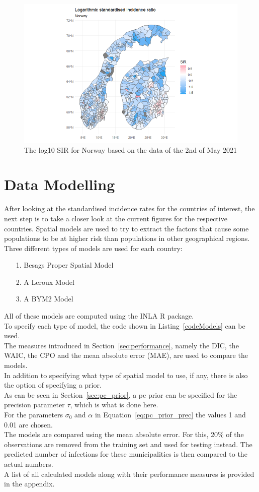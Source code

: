 \begin{figure}[H]
 \centering
 \includegraphics[width = 1.2\textwidth]{sir_norway_log.png}
 \caption{The log10 SIR for Norway based on the data of the 2nd of May 2021}
 \label{sirnorwaylog}
\end{figure}
\clearpage
\section{Data Modelling}
After looking at the standardised incidence rates for the countries of interest, the next step is to take a closer look at the current figures for the respective countries. Spatial models are used to try to extract the factors that cause some populations to be at higher risk than populations in other geographical regions. Three different types of models are used for each country:
\begin{itemize}
  \item[1.] Besags Proper Spatial Model
  \item[2.] A Leroux Model
  \item[3.] A BYM2 Model
\end{itemize}
All of these models are computed using the INLA \cite{rinla} R package. \\
To specify each type of model, the code shown in Listing~\ref{codeModels} can be used. \\
The measures introduced in Section~\ref{sec:performance}, namely the DIC, the WAIC, the CPO and the mean absolute error (MAE), are used to compare the models.\\
In addition to specifying what type of spatial model to use, if any, there is also the option of specifying a prior. \\
As can be seen in Section~\ref{sec:pc_prior}, a pc prior can be specified for the precision parameter $\tau$, which is what is done here. \\
For the parameters $\sigma_0$ and $\alpha$ in Equation~\ref{eq:pc_prior_prec} the values 1 and 0.01 are chosen. \\
The models are compared using the mean absolute error. For this, 20\% of the observations are removed from the training set and used for testing instead. The predicted number of infections for these municipalities is then compared to the actual numbers.
\\
A list of all calculated models along with their performance measures is provided in the appendix.
